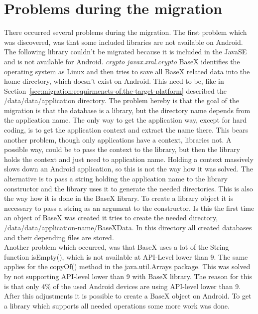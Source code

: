 \section{Problems during the migration}
\label{sec:migration:problems-during-the-migration}
There occurred several problems during the migration.
The first problem which was discovered, was that some included libraries are not available on Android.
The following library couldn't be migrated because it is included in the JavaSE and is not available for Android.
\textit{crypto javax.xml.crypto}
BaseX identifies the operating system as Linux and then tries to save all BaseX related data into the home directory, which doesn't exist on Android.
This need to be, like in Section~\ref{sec:migration:requirmenets-of.the-target-platform} described the /data/data/application directory.
The problem hereby is that the goal of the migration is that the database is a library, but the directory name depends from the application name.
The only way to get the application way, except for hard coding, is to get the application context and extract the name there.
This bears another problem, though only applications have a context, libraries not. 
A possible way, could be to pass the context to the library, but then the library holds the context and just need to application name.
Holding a context massively slows down an Android application, so this is not the way how it was solved.
The alternative is to pass a string holding the application name to the library constructor and the library uses it to generate the needed directories.
This is also the way how it is done in the BaseX library.
To create a library object it is necessary to pass a string as an argument to the constructor.
Is this the first time an object of BaseX was created it tries to create the needed directory, /data/data/application-name/BaseXData.
In this directory all created databases and their depending files are stored.
\\
Another problem which occurred, was that BaseX uses a lot of the String function isEmpty(), which is not available at API-Level lower than 9.
The same applies for the copyOf() method in the java.util.Arrays package.
This was solved by not supporting API-level lower than 9 with BaseX library. 
The reason for this is that only 4\% of the used Android devices are using API-level lower than 9.
\\
After this adjustments it is possible to create a BaseX object on Android.
To get a library which supports all needed operations some more work was done.



